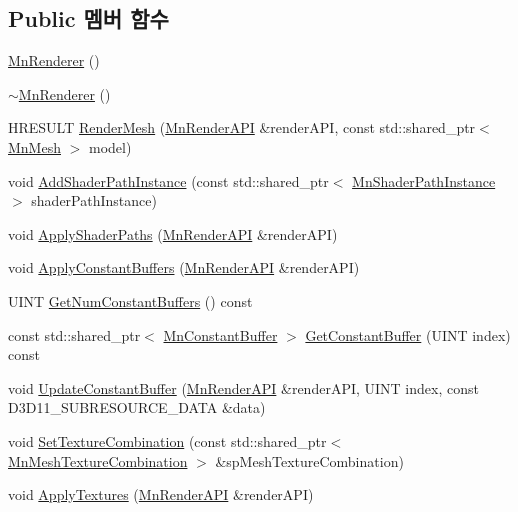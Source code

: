 \subsection*{Public 멤버 함수}
\begin{DoxyCompactItemize}
\item 
\hyperlink{class_m_n_l_1_1_mn_renderer_ae1e6f84fd929f28f088dc75925d3652f}{Mn\+Renderer} ()
\item 
\hyperlink{class_m_n_l_1_1_mn_renderer_ae15a007ddf6e9e4da79e5507c23d2b9e}{$\sim$\+Mn\+Renderer} ()
\item 
H\+R\+E\+S\+U\+LT \hyperlink{class_m_n_l_1_1_mn_renderer_a10074dbdae9aad1b7ef6f576638a35a9}{Render\+Mesh} (\hyperlink{class_m_n_l_1_1_mn_render_a_p_i}{Mn\+Render\+A\+PI} \&render\+A\+PI, const std\+::shared\+\_\+ptr$<$ \hyperlink{class_m_n_l_1_1_mn_mesh}{Mn\+Mesh} $>$ model)
\item 
void \hyperlink{class_m_n_l_1_1_mn_renderer_a160d4cfc3c3155c6a2ec83d63916f7c0}{Add\+Shader\+Path\+Instance} (const std\+::shared\+\_\+ptr$<$ \hyperlink{class_m_n_l_1_1_mn_shader_path_instance}{Mn\+Shader\+Path\+Instance} $>$ shader\+Path\+Instance)
\item 
void \hyperlink{class_m_n_l_1_1_mn_renderer_a595c562da7e6319c981aee79122bf568}{Apply\+Shader\+Paths} (\hyperlink{class_m_n_l_1_1_mn_render_a_p_i}{Mn\+Render\+A\+PI} \&render\+A\+PI)
\item 
void \hyperlink{class_m_n_l_1_1_mn_renderer_ae855b8a2e919d2d105f9f5b9a95f5bc6}{Apply\+Constant\+Buffers} (\hyperlink{class_m_n_l_1_1_mn_render_a_p_i}{Mn\+Render\+A\+PI} \&render\+A\+PI)
\item 
U\+I\+NT \hyperlink{class_m_n_l_1_1_mn_renderer_a64e1428dc0d2835c69077c3391841c68}{Get\+Num\+Constant\+Buffers} () const
\item 
const std\+::shared\+\_\+ptr$<$ \hyperlink{class_m_n_l_1_1_mn_constant_buffer}{Mn\+Constant\+Buffer} $>$ \hyperlink{class_m_n_l_1_1_mn_renderer_af2acf082128e501b64645c3cb19fbe32}{Get\+Constant\+Buffer} (U\+I\+NT index) const
\item 
void \hyperlink{class_m_n_l_1_1_mn_renderer_a04dcf13f6f822d2c9c68469a2a0c9ad7}{Update\+Constant\+Buffer} (\hyperlink{class_m_n_l_1_1_mn_render_a_p_i}{Mn\+Render\+A\+PI} \&render\+A\+PI, U\+I\+NT index, const D3\+D11\+\_\+\+S\+U\+B\+R\+E\+S\+O\+U\+R\+C\+E\+\_\+\+D\+A\+TA \&data)
\item 
void \hyperlink{class_m_n_l_1_1_mn_renderer_ae8b45346fcd79ac0f881444ee3b526d6}{Set\+Texture\+Combination} (const std\+::shared\+\_\+ptr$<$ \hyperlink{class_m_n_l_1_1_mn_mesh_texture_combination}{Mn\+Mesh\+Texture\+Combination} $>$ \&sp\+Mesh\+Texture\+Combination)
\item 
void \hyperlink{class_m_n_l_1_1_mn_renderer_a8a1dbdc2abb81d46c786bde59305455b}{Apply\+Textures} (\hyperlink{class_m_n_l_1_1_mn_render_a_p_i}{Mn\+Render\+A\+PI} \&render\+A\+PI)
\end{DoxyCompactItemize}
